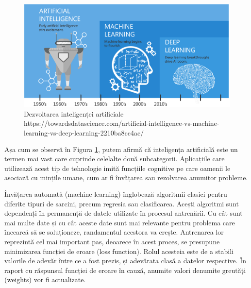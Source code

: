 \documentclass[a4paper, 12pt]{report}
\begin{document}
	\begin{figure}[h]
		\begin{center}
			\includegraphics[scale=0.8]{images/AI_ML_DL.png}
		\end{center}
		\caption{Dezvoltarea inteligenței artificiale\newline
			\hspace{\linewidth}https://towardsdatascience.com/artificial-intelligence-vs-machine-learning-vs-deep-learning-2210ba8cc4ac/}
		\label{fig:AI_ML_DL}
	\end{figure}
	
	Așa cum se observă în Figura \ref{fig:AI_ML_DL}, putem afirmă că inteligența artificială este un termen mai vast care cuprinde celelalte două subcategorii. Aplicațiile care utilizează acest tip de tehnologie imită funcțiile cognitive pe care oamenii le asociază cu mințile umane, cum ar fi învățarea sau rezolvarea anumitor probleme.
	
	Învățarea automată (machine learning) înglobează algoritmii clasici pentru diferite tipuri de sarcini, precum regresia sau clasificarea. Acești algoritmi sunt dependenți în permanență de datele utilizate în procesul antrenării. Cu cât sunt mai multe date și cu cât aceste date sunt mai relevante pentru problema care încearcă să se soluționeze, randamentul acestora va crește. Antrenarea lor reprezintă cel mai important pas, deoarece în acest proces, se presupune minimizarea funcției de eroare (loss function). Rolul acesteia este de a stabili valorile de adevăr între ce a fost prezis, și adevărata clasă a datelor respective. În raport cu răspunsul funcției de eroare în cauză, anumite valori denumite greutăți (weights) vor fi actualizate.
	
\end{document}
